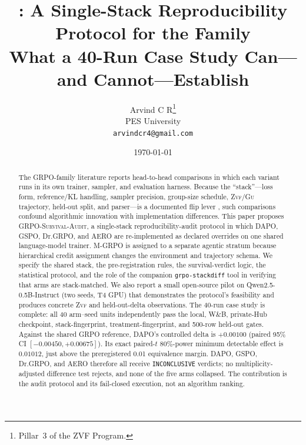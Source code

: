 \documentclass[11pt]{article}
\title{\audit{}: A Single-Stack Reproducibility Protocol for the \grpo{} Family\\
\large What a 40-Run Case Study Can---and Cannot---Establish}
\author{Arvind C R\thanks{Pillar~3 of the ZVF Program.}\\
PES University\\\texttt{arvindcr4@gmail.com}}
\date{\today}
\newcommand{\zvf}{\textsc{Zvf}}
\newcommand{\gu}{\textsc{Gu}}
\newcommand{\grpo}{\textsc{GRPO}}
\newcommand{\audit}{\textsc{GRPO-Survival-Audit}}
\newcommand{\AuditDAPODelta}{+0.00100}
\newcommand{\AuditDAPOCILow}{-0.00450}
\newcommand{\AuditDAPOCIHigh}{+0.00675}
\newcommand{\AuditDAPOMDE}{0.01012}
\begin{document}
\maketitle

\begin{abstract}
The \grpo{}-family literature reports head-to-head comparisons in which each
variant runs in its own trainer, sampler, and evaluation harness. Because the
``stack''---loss form, reference/KL handling, sampler precision, group-size
schedule, \zvf/\gu{} trajectory, held-out split, and parser---is a documented
flip lever \cite{minreportrl2026}, such comparisons confound algorithmic
innovation with implementation differences. This paper proposes \audit{}, a
single-stack reproducibility-audit protocol in which DAPO, GSPO, Dr.\grpo{},
and AERO are re-implemented as declared overrides on one shared language-model
trainer. M-\grpo{} is assigned to a separate agentic stratum because
hierarchical credit assignment changes the environment and trajectory schema.
We specify the shared
stack, the pre-registration rules, the survival-verdict logic, the statistical
protocol, and the role of the companion \texttt{grpo-stackdiff} tool in
verifying that arms are stack-matched. We also report a small open-source pilot
on Qwen2.5-0.5B-Instruct (two seeds, T4 GPU) that demonstrates the protocol's
feasibility and produces concrete \zvf{} and held-out-delta observations. The
40-run case study is complete: all 40 arm--seed units independently pass
the local, W\&B, private-Hub checkpoint, stack-fingerprint,
treatment-fingerprint, and 500-row held-out gates. Against the shared GRPO
reference, DAPO's controlled delta is $\AuditDAPODelta$ (paired 95\% CI
$[\AuditDAPOCILow,\AuditDAPOCIHigh]$). Its exact paired-$t$ 80\%-power
minimum detectable effect is $\AuditDAPOMDE$, just above the preregistered
0.01 equivalence margin. DAPO, GSPO, Dr.\grpo{}, and AERO therefore all receive
\texttt{INCONCLUSIVE} verdicts; no multiplicity-adjusted difference test
rejects, and none of the five arms collapsed. The contribution is the audit
protocol and its fail-closed execution, not an algorithm ranking.
\end{abstract}
\end{document}
